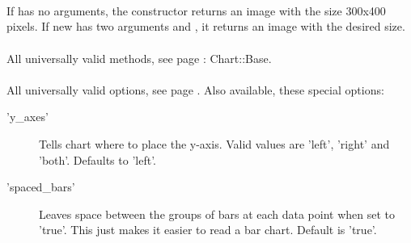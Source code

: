 \\
\\
\\
If  has no arguments, the constructor returns an image with the size 300x400 pixels. If new has two arguments  and , it returns an image with the desired size. \\ 
\\ 
All universally valid methods, see page \pageref{methods}: Chart::Base. \\
\\
 All universally valid options, see page \pageref{options}. Also available, these special options:
\begin{description}
\item['y\_axes'] Tells chart where to place the y-axis. Valid values are 'left', 'right' and 'both'. Defaults to 'left'.
\item['spaced\_bars']Leaves space between the groups of bars at each data point when set to 'true'.  This just makes it easier to read a bar chart.  Default is 'true'.
\end{description}